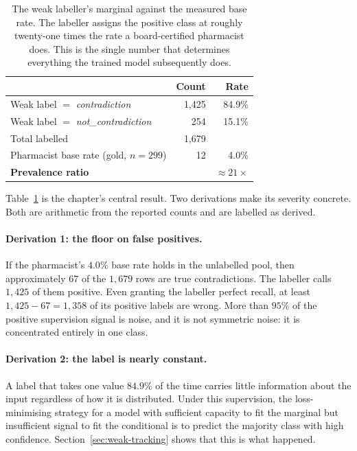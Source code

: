 \begin{table}[t]
\centering
\small
\begin{tabular}{lrr}
\toprule
 & \textbf{Count} & \textbf{Rate} \\
\midrule
Weak label $=$ \emph{contradiction}      & 1,425 & 84.9\% \\
Weak label $=$ \emph{not\_contradiction} & 254   & 15.1\% \\
\midrule
Total labelled                            & 1,679 & \\
\midrule
Pharmacist base rate (gold, $n{=}299$)    & 12 & 4.0\% \\
\midrule
\textbf{Prevalence ratio}                 & & \textbf{$\approx 21\times$} \\
\bottomrule
\end{tabular}
\caption{The weak labeller's marginal against the measured base rate. The
labeller assigns the positive class at roughly twenty-one times the rate a
board-certified pharmacist does. This is the single number that determines
everything the trained model subsequently does.}
\label{tab:prevalence}
\end{table}

Table~\ref{tab:prevalence} is the chapter's central result. Two derivations make
its severity concrete. Both are arithmetic from the reported counts and are
labelled as derived.

\paragraph{Derivation 1: the floor on false positives.} If the pharmacist's
$4.0\%$ base rate holds in the unlabelled pool, then approximately $67$ of the
$1{,}679$ rows are true contradictions. The labeller calls $1{,}425$ of them
positive. Even granting the labeller perfect recall, at least
$1{,}425 - 67 = 1{,}358$ of its positive labels are wrong. More than $95\%$ of
the positive supervision signal is noise, and it is not symmetric noise: it is
concentrated entirely in one class.

\paragraph{Derivation 2: the label is nearly constant.} A label that takes one
value $84.9\%$ of the time carries little information about the input regardless
of how it is distributed. Under this supervision, the loss-minimising strategy
for a model with sufficient capacity to fit the marginal but insufficient signal
to fit the conditional is to predict the majority class with high confidence.
Section~\ref{sec:weak-tracking} shows that this is what happened.

